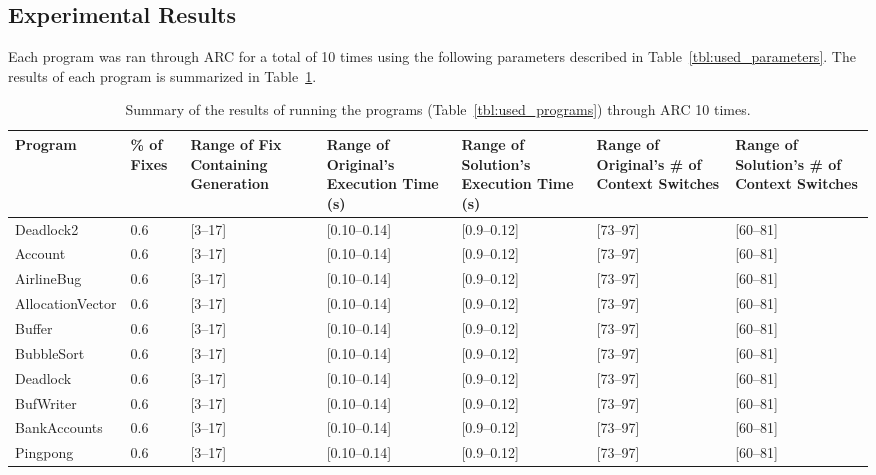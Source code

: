 \documentclass[10pt, conference, compsocconf]{IEEEtran}
\begin{document}
\subsection{Experimental Results}
\label{sec:experimental_results}

Each program was ran through ARC for a total of 10 times using the following
parameters described in Table~\ref{tbl:used_parameters}. The results of each
program is summarized in Table~\ref{tbl:summary_results}.

\begin{table}[!t]
\begin{center}
\begin{tabular}{|p{2cm}|p{0.6cm}|p{1.75cm}|p{2cm}|p{2cm}|p{2cm}|p{2cm}|}
\hline
\textbf{Program} &
\textbf{\% of Fixes} &
\textbf{Range of Fix Containing Generation} &
\textbf{Range of Original's Execution Time (s)} &
\textbf{Range of Solution's Execution Time (s)} &
\textbf{Range of Original's \# of Context Switches} &
\textbf{Range of Solution's \# of Context Switches}
\\\hline
Deadlock2 & 0.6 & [3--17] & [0.10--0.14] & [0.9--0.12] & [73--97] & [60--81]
\\\hline
Account & 0.6 & [3--17] & [0.10--0.14] & [0.9--0.12] & [73--97] & [60--81]
\\\hline
AirlineBug & 0.6 & [3--17] & [0.10--0.14] & [0.9--0.12] & [73--97] & [60--81]
\\\hline
AllocationVector & 0.6 & [3--17] & [0.10--0.14] & [0.9--0.12] & [73--97] & [60--81]
\\\hline
Buffer & 0.6 & [3--17] & [0.10--0.14] & [0.9--0.12] & [73--97] & [60--81]
\\\hline
BubbleSort & 0.6 & [3--17] & [0.10--0.14] & [0.9--0.12] & [73--97] & [60--81]
\\\hline
Deadlock & 0.6 & [3--17] & [0.10--0.14] & [0.9--0.12] & [73--97] & [60--81]
\\\hline
BufWriter & 0.6 & [3--17] & [0.10--0.14] & [0.9--0.12] & [73--97] & [60--81]
\\\hline
BankAccounts & 0.6 & [3--17] & [0.10--0.14] & [0.9--0.12] & [73--97] & [60--81]
\\\hline
Pingpong & 0.6 & [3--17] & [0.10--0.14] & [0.9--0.12] & [73--97] & [60--81]
\\\hline
\end{tabular}
\caption{Summary of the results of running the programs (Table~\ref{tbl:used_programs}) through ARC 10 times.}
\label{tbl:summary_results}
\end{center}
\end{table}
\end{document}
